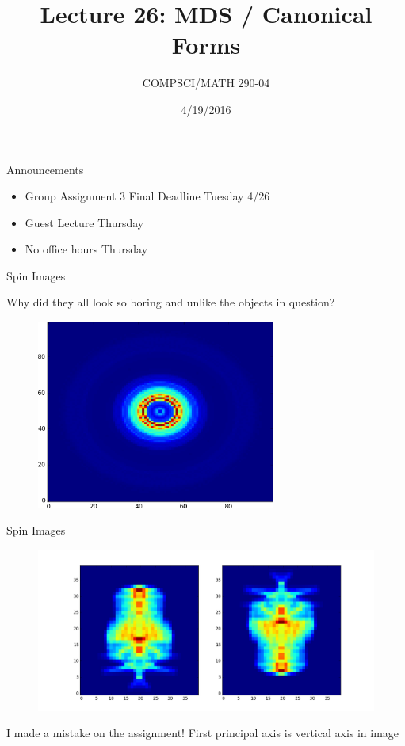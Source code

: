 \documentclass{beamer}
\title{Lecture 26: MDS / Canonical Forms}
\date{4/19/2016}
\institute{Chris Tralie, Duke University}
\author{COMPSCI/MATH 290-04}
\begin{document}
\frame{\titlepage}

\begin{frame}{Announcements}
\begin{itemize}[label=$\vartriangleright$]

\item Group Assignment 3 Final Deadline Tuesday 4/26

\item Guest Lecture Thursday

\item No office hours Thursday

\end{itemize}

\end{frame}


\begin{frame}{Spin Images}

Why did they all look so boring and unlike the objects in question?

\begin{figure}[t]
    \includegraphics[width=0.7\textwidth]{SpinImage.png}
\end{figure}


\end{frame}

\begin{frame}{Spin Images}

\begin{figure}[t]
    \includegraphics[width=\textwidth]{Hist12.png}
\end{figure}

I made a mistake on the assignment!  First principal axis is vertical axis in image

\end{frame}
\end{document}
